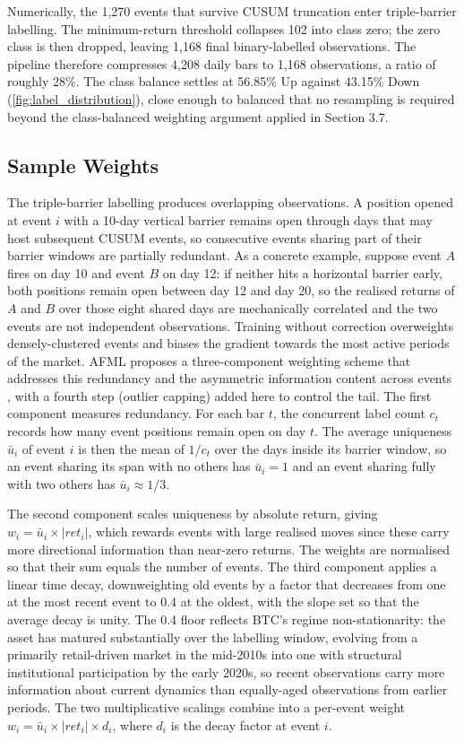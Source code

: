 Numerically, the 1,270 events that survive CUSUM truncation enter triple-barrier labelling. The minimum-return threshold collapses 102 into class zero; the zero class is then dropped, leaving 1,168 final binary-labelled observations. The pipeline therefore compresses 4,208 daily bars to 1,168 observations, a ratio of roughly 28\%. The class balance settles at 56.85\% Up against 43.15\% Down (\label{ref:label_dist_call}\autoref{fig:label_distribution}), close enough to balanced that no resampling is required beyond the class-balanced weighting argument applied in Section 3.7.


\subsection{Sample Weights}\label{subsec:weights}

The triple-barrier labelling produces overlapping observations. A position opened at event $i$ with a 10-day vertical barrier remains open through days that may host subsequent CUSUM events, so consecutive events sharing part of their barrier windows are partially redundant. As a concrete example, suppose event $A$ fires on day 10 and event $B$ on day 12: if neither hits a horizontal barrier early, both positions remain open between day 12 and day 20, so the realised returns of $A$ and $B$ over those eight shared days are mechanically correlated and the two events are not independent observations. Training without correction overweights densely-clustered events and biases the gradient towards the most active periods of the market. AFML proposes a three-component weighting scheme that addresses this redundancy and the asymmetric information content across events \citep[Chapter 4]{lopez_de_prado_2018}, with a fourth step (outlier capping) added here to control the tail. The first component measures redundancy. For each bar $t$, the concurrent label count $c_t$ records how many event positions remain open on day $t$. The average uniqueness $\bar{u}_i$ of event $i$ is then the mean of $1/c_t$ over the days inside its barrier window, so an event sharing its span with no others has $\bar{u}_i = 1$ and an event sharing fully with two others has $\bar{u}_i \approx 1/3$.

The second component scales uniqueness by absolute return, giving $w_i = \bar{u}_i \times |ret_i|$, which rewards events with large realised moves since these carry more directional information than near-zero returns. The weights are normalised so that their sum equals the number of events. The third component applies a linear time decay, downweighting old events by a factor that decreases from one at the most recent event to 0.4 at the oldest, with the slope set so that the average decay is unity. The 0.4 floor reflects BTC's regime non-stationarity: the asset has matured substantially over the labelling window, evolving from a primarily retail-driven market in the mid-2010s into one with structural institutional participation by the early 2020s, so recent observations carry more information about current dynamics than equally-aged observations from earlier periods. The two multiplicative scalings combine into a per-event weight $w_i = \bar{u}_i \times |ret_i| \times d_i$, where $d_i$ is the decay factor at event $i$.

